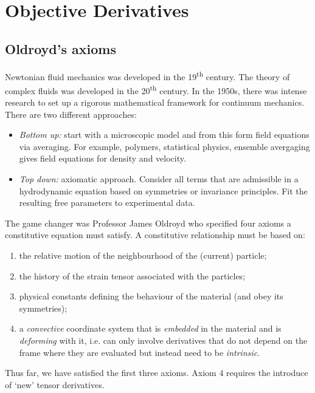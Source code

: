 \documentclass{jknotes}
\begin{document}
\section{Objective Derivatives}
\subsection{Oldroyd's axioms}
Newtonian fluid mechanics was developed in the 19\textsuperscript{th} century.
The theory of complex fluids was developed in the 20\textsuperscript{th}
century. In the 1950s, there was intense research to set up a rigorous
mathematical framework for continuum mechanics. There are two different
approaches:
\begin{itemize}
	\item \emph{Bottom up:} start with a microscopic model and from this form
		field equations via averaging. For example, polymers, statistical
		physics, ensemble avergaging gives field equations for density and
		velocity.
	\item \emph{Top down:} axiomatic approach. Consider all terms that are
		admissible in a hydrodynamic equation based on symmetries or
		invariance principles. Fit the resulting free parameters to
		experimental data.
\end{itemize}

The game changer was Professor James Oldroyd who specified four axioms a
constitutive equation must satisfy. A constitutive relationship must be based
on:
\begin{enumerate}
	\item the relative motion of the neighbourhood of the (current) particle;
	\item the history of the strain tensor associated with the particles;
	\item physical constants defining the behaviour of the material (and obey
		its symmetries);
	\item a \emph{convective} coordinate system that is \emph{embedded} in the
		material and is \emph{deforming} with it, i.e. can only involve
		derivatives that do not depend on the frame where they are evaluated
		but instead need to be \emph{intrinsic}.
\end{enumerate}

Thus far, we have satisfied the first three axioms. Axiom 4 requires the
introduce of `new' tensor derivatives.
\end{document}
